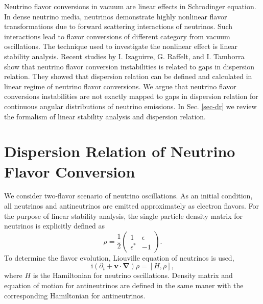 \documentclass[%
 reprint,
 amsmath,amssymb,
 aps,
 prd
]{revtex4-1}
\newcommand{\ii}{\mathrm i}
\begin{document}
Neutrino flavor conversions in vacuum are linear effects in Schrodinger equation. In dense neutrino media, neutrinos demonstrate highly nonlinear flavor transformations due to forward scattering interactions of neutrinos. Such interactions lead to flavor conversions of different category from vacuum oscillations. The technique used to investigate the nonlinear effect is linear stability analysis.\cite{Banerjee2011a,Raffelt2013} Recent studies by I. Izaguirre, G. Raffelt, and I. Tamborra show that neutrino flavor conversion instabilities is related to gaps in dispersion relation.\cite{Izaguirre2016a} They showed that dispersion relation can be defined and calculated in linear regime of neutrino flavor conversions. We argue that neutrino flavor conversions instabilities are not exactly mapped to gaps in dispersion relation for continuous angular distributions of neutrino emissions. In Sec. \ref{sec-dr} we review the formalism of linear stability analysis and dispersion relation.


\section{\label{sec-dr}Dispersion Relation of Neutrino Flavor Conversion}

We consider two-flavor scenario of neutrino oscillations. As an initial condition, all neutrinos and antineutrinos are emitted approximately as electron flavors. For the purpose of linear stability analysis, the single particle density matrix for neutrinos is explicitly defined as
\begin{equation}
   \rho = \frac{1}{2} \begin{pmatrix}
   1 & \epsilon \\
   \epsilon^* & -1
\end{pmatrix}.
\end{equation}
To determine the flavor evolution, Liouville equation of neutrinos is used,
\begin{equation}
\ii (\partial_t + \mathbf v\cdot \boldsymbol{\nabla}) \rho = \left[ H, \rho \right],
\label{eqn-liouville-eqn}
\end{equation}
where $H$ is the Hamiltonian for neutrino oscillations. Density matrix and equation of motion for antineutrinos are defined in the same maner with the corresponding Hamiltonian for antineutrinos.
\end{document}
